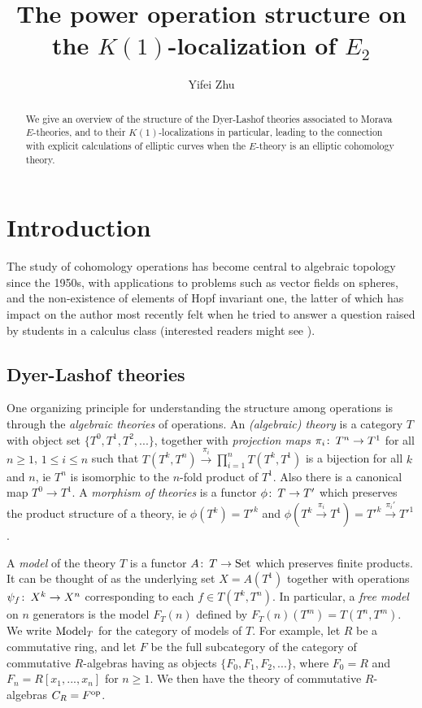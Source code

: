 \documentclass{gtpart}
\title{The power operation structure on the $K(1)$-localization of $E_2$}
\author{Yifei Zhu}
\theoremstyle{definition}
\theoremstyle{remark}
\def\co{\colon\thinspace}
\newcommand{\Model}{{\rm Model}}
\begin{document}
\begin{abstract}
  We give an overview of the structure of the Dyer-Lashof theories 
  associated to Morava $E$-theories, and to their $K(1)$-localizations 
  in particular, leading to the connection with explicit calculations of 
  elliptic curves when the $E$-theory is an elliptic cohomology theory.
\end{abstract}

\maketitle
\section{Introduction}
\label{sec:intro}


The study of cohomology operations has become central to algebraic 
topology since the 1950s, with applications to problems such as vector 
fields on spheres, and the non-existence of elements of Hopf invariant 
one, the latter of which has impact on the author most recently felt 
when he tried to answer a question raised by students in a calculus 
class (interested readers might see \cite{massey}).  


\subsection{Dyer-Lashof theories}
\label{subsec:DL}

One organizing principle for understanding the structure among 
operations is through the {\em algebraic theories} of operations.  An 
{\em (algebraic) theory} is a category $T$ with object set 
$\{T^0,T^1,T^2,...\}$, together with {\em projection maps} 
$\pi_i\co T^n \to T^1$ for all $n \geq 1$, $1 \leq i \leq n$ such that 
$T(T^k,T^n) \xrightarrow{\pi_i} \prod_{i=1}^n T(T^k,T^1)$ is a 
bijection for all $k$ and $n$, ie $T^n$ is isomorphic to the $n$-fold product 
of $T^1$.  Also there is a canonical map $T^0 \to T^1$.  A {\em morphism 
of theories} is a functor $\phi\co T \to T'$ which preserves the product 
structure of a theory, ie $\phi(T^k) = T'^k$ and 
$\phi(T^k \stackrel{\pi_i}{\longrightarrow} T^1) = T'^k \stackrel{\pi_i'}{\longrightarrow} T'^1$.  

A {\em model} of the theory $T$ is a functor $A\co T \to \rm{Set}$ which 
preserves finite products.  It can be thought of as the 
underlying set $X = A(T^1)$ together with operations 
$\psi_f\co X^k \to X^n$ corresponding to each $f \in T(T^k,T^n)$.  
In particular, a {\em free model} on $n$ generators is the model 
$F_T(n)$ defined by $F_T(n)(T^m) = T(T^n,T^m)$.  We write $\Model_T$ 
for the category of models of $T$.  For example, let $R$ be 
a commutative ring, and let $F$ be the full subcategory of 
the category of commutative $R$-algebras having as objects $\{F_0,F_1,F_2,...\}$, where 
$F_0 = R$ and $F_n = R[x_1,...,x_n]$ for $n \geq 1$.  We then have 
the theory of commutative $R$-algebras $C_R = F^{\rm op}$.  
\end{document}
